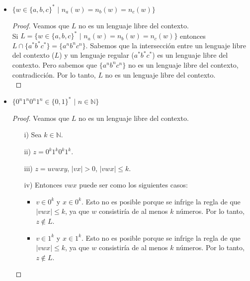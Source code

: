 \documentclass[letterpaper,11pt]{article}
\begin{document}
\begin{enumerate}
\begin{itemize}
\begin{proof}
\begin{itemize}
               \end{itemize}
               Por lo tanto, L no es un lenguaje libre del contexto. \\
           \end{proof}
           
           \item $\{w \in \{a,b,c\}^{*}$ $|$ $n_a(w) = n_b(w) = n_c(w)\}$
           \begin{proof} Veamos que $L$ no es un lenguaje libre del contexto. \\
               Si $L = \{w \in \{a,b,c\}^{*}$ $|$ $n_a(w) = n_b(w) = n_c(w)\}$
               entonces $L \cap \{a^{*}b^{*}c^{*}\} = \{a^{n}b^{n}c^{n}\}$. 
               Sabemos que la intersección entre un lenguaje libre del contexto
               ($L$) y un lenguaje regular ($a^{*}b^{*}c^{*}$) es un lenguaje
               libre del contexto. Pero sabemos que $\{a^{n}b^{n}c^{n}\}$ no es
               un lenguaje libre del contexto, contradicción. Por lo tanto,
               $L$ no es un lenguaje libre del contexto.\\
           \end{proof}
           
           \newpage
           \item $\{0^{n}1^{n}0^{n}1^{n} \in \{0, 1\}^{*}$ $|$
           $n \in \mathbb{N}\}$
           \begin{proof} Veamos que $L$ no es un lenguaje libre del contexto. 
               \begin{itemize}
                   \item[i)] Sea $k \in \mathbb{N}$.
                   \item[ii)] $z = 0^{k}1^{k}0^{k}1^{k}$.
                   \item[iii)] $z = uvwxy$, $|vx| > 0$, $|vwx| \leq k$.
                   \item[iv)] Entonces $vwx$ puede ser como los siguientes casos:
                   \begin{itemize}
                       \item $v \in 0^{k}$ y $x \in 0^{k}$. Esto no es posible
                       porque se infrige la regla de que $|vwx| \leq k$, ya que
                       $w$ consistiría de al menos $k$ números. Por lo tanto, $z \notin L$.
                       
                       \item $v \in 1^{k}$ y $x \in 1^{k}$. Esto no es posible
                       porque se infrige la regla de que $|vwx| \leq k$, ya que
                       $w$ consistiría de al menos $k$ números. Por lo tanto, $z \notin L$.
                       

\end{itemize}
\end{itemize}
\end{proof}
\end{itemize}
\end{enumerate}
\end{document}
